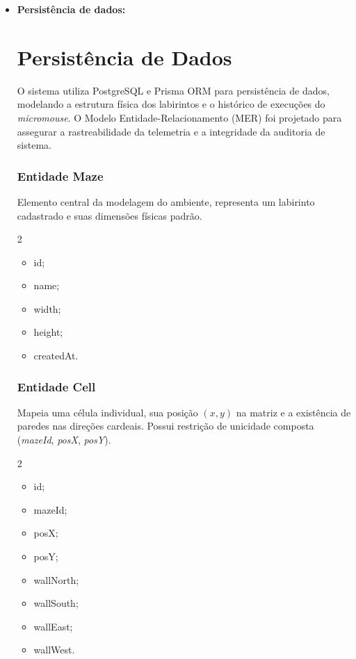 \begin{itemize}
\begin{itemize}
    \item \textbf{Persistência de dados:}

\section{Persistência de Dados}

O sistema utiliza PostgreSQL e Prisma ORM para persistência de dados, modelando a estrutura física dos labirintos e o histórico de execuções do \textit{micromouse}. O Modelo Entidade-Relacionamento (MER) foi projetado para assegurar a rastreabilidade da telemetria e a integridade da auditoria de sistema.

\subsubsection*{Entidade Maze}
Elemento central da modelagem do ambiente, representa um labirinto cadastrado e suas dimensões físicas padrão.
\begin{multicols}{2}
\begin{itemize}
    \item id; \item name; \item width; \item height; \item createdAt.
\end{itemize}
\end{multicols}

\subsubsection*{Entidade Cell}
Mapeia uma célula individual, sua posição $(x,y)$ na matriz e a existência de paredes nas direções cardeais. Possui restrição de unicidade composta (\textit{mazeId}, \textit{posX}, \textit{posY}).
\begin{multicols}{2}
\begin{itemize}
    \item id; \item mazeId; \item posX; \item posY; \item wallNorth; \item wallSouth; \item wallEast; \item wallWest.
\end{itemize}
\end{multicols}


\end{itemize}
\end{itemize}
